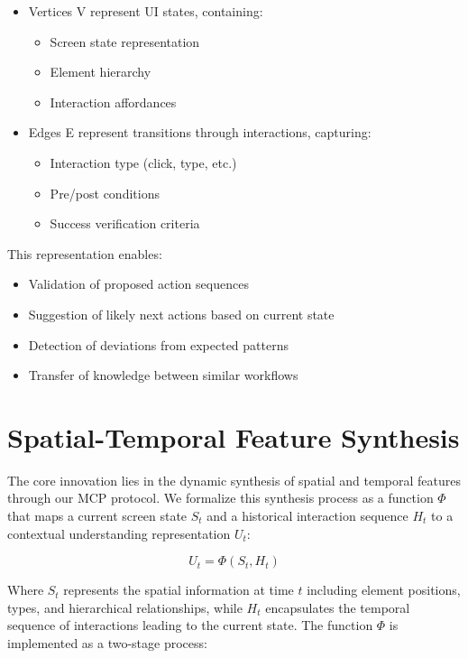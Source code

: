 \documentclass{article}
\begin{document}
\begin{itemize}
    \item Vertices V represent UI states, containing:
    \begin{itemize}
        \item Screen state representation
        \item Element hierarchy
        \item Interaction affordances
    \end{itemize}
    \item Edges E represent transitions through interactions, capturing:
    \begin{itemize}
        \item Interaction type (click, type, etc.)
        \item Pre/post conditions
        \item Success verification criteria
    \end{itemize}
\end{itemize}

This representation enables:
\begin{itemize}
    \item Validation of proposed action sequences
    \item Suggestion of likely next actions based on current state
    \item Detection of deviations from expected patterns
    \item Transfer of knowledge between similar workflows
\end{itemize}

\section{Spatial-Temporal Feature Synthesis}

The core innovation lies in the dynamic synthesis of spatial and temporal features through our MCP protocol. We formalize this synthesis process as a function $\Phi$ that maps a current screen state $S_t$ and a historical interaction sequence $H_t$ to a contextual understanding representation $U_t$:

\begin{equation}
U_t = \Phi(S_t, H_t)
\end{equation}

Where $S_t$ represents the spatial information at time $t$ including element positions, types, and hierarchical relationships, while $H_t$ encapsulates the temporal sequence of interactions leading to the current state. The function $\Phi$ is implemented as a two-stage process:
\end{document}
